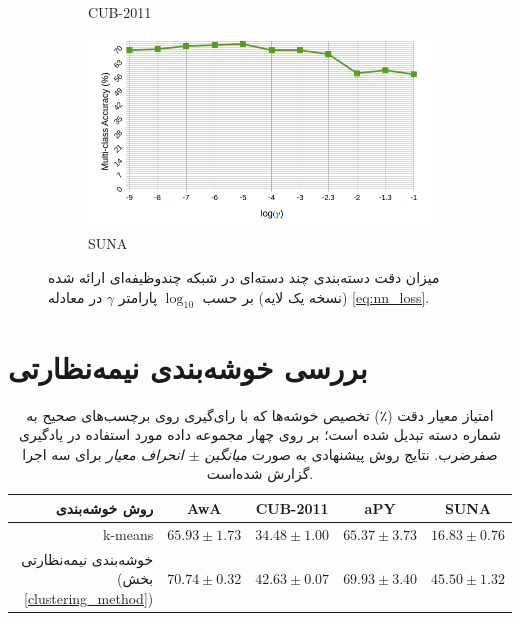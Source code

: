 \begin{figure}[!th]
\begin{subfigure}[b]{0.43\linewidth}
    \caption{CUB-2011}
\end{subfigure}
\begin{subfigure}[b]{0.43\linewidth}
    \includegraphics[width=\linewidth]{images/nn_param_sun}
    \caption{SUNA}
\end{subfigure}
\caption[نمودار تحلیل پارامتر شبکه عصبی]{
میزان دقت دسته‌بندی چند دسته‌ای در شبکه چندوظیفه‌ای ارائه شده (نسخه یک لایه) بر حسب $\log_{10}$ پارامتر $\gamma$ در معادله
\eqref{eq:nn_loss}.
}
\label{fig:nn_param}
\end{figure}




\section{بررسی خوشه‌بندی نیمه‌نظارتی}
\begin{table}[ht]
\centering
\caption[بررسی عمل‌کرد خوشه‌بندی نیمه‌نظارتی پیشنهاتی]{
امتیاز معیار دقت (٪) تخصیص خوشه‌ها که با رای‌گیری روی برچسب‌های صحیح به شماره دسته تبدیل شده است؛ بر روی چهار مجموعه داده مورد استفاده در یادگیری صفرضرب. نتایج روش پیشنهادی به صورت
\textit{ میانگین $\pm$ انحراف معیار }
برای سه اجرا گزارش شده‌است.}
\vspace*{2mm}
  \label{tab:clustering}
\begin{tabular}{|r|c|c|c|c|}
\hline
روش خوشه‌بندی & AwA & CUB-2011 & aPY & SUNA \\
\hline
k-means                             &  ${65.93 \pm 1.73}$                 & ${34.48 \pm 1.00}$           & ${65.37 \pm 3.73 }$               & ${16.83 \pm 0.76 }$   \\
\hline
خوشه‌بندی نیمه‌نظارتی (بخش \ref{clustering_method})
                      & \textbf{${70.74\pm 0.32}$}  & \textbf{${42.63\pm 0.07}$} & \textbf{${69.93\pm 3.40}$} & \textbf{ ${45.50 \pm 1.32}$} \\
\hline
\end{tabular}
\vspace{2mm}
\end{table}

